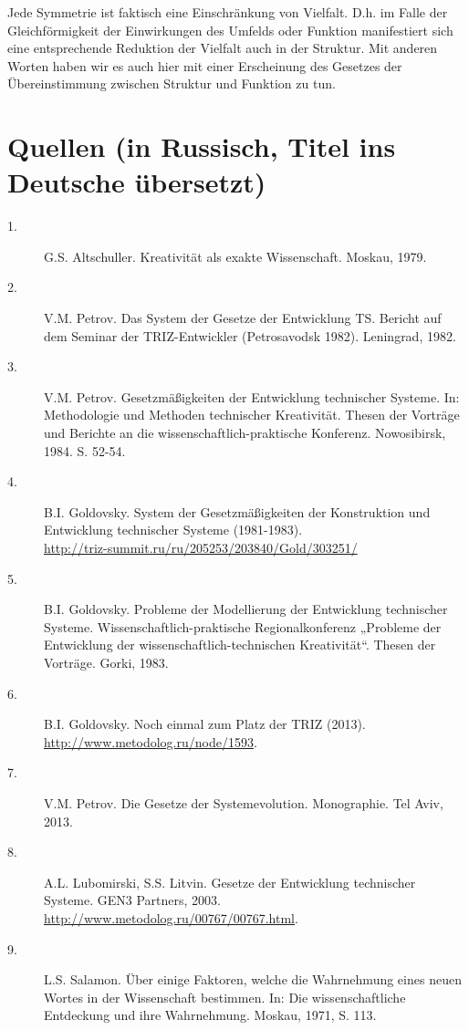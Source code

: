 \documentclass[11pt,a4paper]{article}
\begin{document}
Jede Symmetrie ist faktisch eine Einschränkung von Vielfalt. D.h. im Falle der
Gleichförmig\-keit der Einwirkungen des Umfelds oder Funktion manifestiert
sich eine entsprechende Reduktion der Vielfalt auch in der Struktur. Mit
anderen Worten haben wir es auch hier mit einer Erscheinung des Gesetzes der
Übereinstimmung zwischen Struktur und Funktion zu tun.

\section*{Quellen (in Russisch, Titel ins Deutsche übersetzt)}
\begin{description}
\item[1.] G.S. Altschuller. Kreativität als exakte Wissenschaft.  Moskau,
  1979.
\item[2.] V.M. Petrov. Das System der Gesetze der Entwicklung TS. Bericht auf
  dem Seminar der TRIZ-Entwickler (Petrosavodsk 1982). Leningrad, 1982.
\item[3.] V.M. Petrov. Gesetzmäßigkeiten der Entwicklung technischer Systeme.
  In: Methodologie und Methoden technischer Kreativität. Thesen der Vorträge
  und Berichte an die wissenschaftlich-praktische Konferenz.  Nowosibirsk,
  1984.  S. 52-54.
\item[4.] B.I. Goldovsky. System der Gesetzmäßigkeiten der Konstruktion und
  Entwicklung technischer Systeme (1981-1983).\\
  \url{http://triz-summit.ru/ru/205253/203840/Gold/303251/}
\item[5.] B.I. Goldovsky. Probleme der Modellierung der Entwicklung
  technischer Systeme.  Wissen\-schaftlich-praktische Regionalkonferenz
  „Probleme der Entwicklung der wissenschaft\-lich-technischen Kreativität“.
  Thesen der Vorträge. Gorki, 1983.
\item[6.] B.I. Goldovsky. Noch einmal zum Platz der TRIZ (2013).\\
  \url{http://www.metodolog.ru/node/1593}. 
\item[7.] V.M. Petrov. Die Gesetze der Systemevolution. Monographie. Tel Aviv,
  2013.
 \item[8.] A.L. Lubomirski, S.S. Litvin. Gesetze der Entwicklung technischer
   Systeme. GEN3 Partners, 2003.
   \url{http://www.metodolog.ru/00767/00767.html}. 
\item[9.] L.S. Salamon. Über einige Faktoren, welche die Wahrnehmung eines
  neuen Wortes in der Wissenschaft bestimmen. In: Die wissenschaftliche
  Entdeckung und ihre Wahrnehmung. Moskau, 1971, S. 113.

\end{description}
\end{document}
